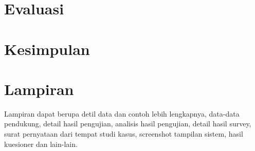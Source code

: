 \section{Evaluasi}

   
\section{Kesimpulan}
 
 





\section*{Lampiran}

\noindent Lampiran dapat berupa detil data dan contoh lebih lengkapnya, data-data pendukung, detail hasil pengujian, analisis hasil pengujian, detail hasil survey, surat pernyataan dari tempat studi kasus, screenshot tampilan sistem, hasil kuesioner dan lain-lain.